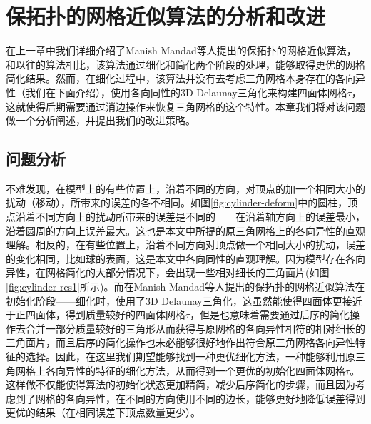 \chapter{保拓扑的网格近似算法的分析和改进}

在上一章中我们详细介绍了Manish Mandad等人提出的保拓扑的网格近似算法\cite{isotopic-appro}，和以往的算法相比，该算法通过细化和简化两个阶段的处理，能够取得更优的网格简化结果。然而，在细化过程中，该算法并没有去考虑三角网格本身存在的各向异性（我们在下面介绍），使用各向同性的3D Delaunay三角化来构建四面体网格$\tau$，这就使得后期需要通过消边操作来恢复三角网格的这个特性。本章我们将对该问题做一个分析阐述，并提出我们的改进策略。

\section{问题分析}
不难发现，在模型上的有些位置上，沿着不同的方向，对顶点的加一个相同大小的扰动（移动），所带来的误差的各不相同。如图\ref{fig:cylinder-deform}中的圆柱，顶点沿着不同方向上的扰动所带来的误差是不同的——在沿着轴方向上的误差最小，沿着圆周的方向上误差最大。这也是本文中所提的原三角网格上的各向异性的直观理解。相反的，在有些位置上，沿着不同方向对顶点做一个相同大小的扰动，误差的变化相同，比如球的表面，这是本文中各向同性的直观理解。因为模型存在各向异性，在网格简化的大部分情况下，会出现一些相对细长的三角面片(如图\ref{fig:cylinder-res1}所示)。而在Manish Mandad等人提出的保拓扑的网格近似算法在初始化阶段——细化时，使用了3D Delaunay三角化，这虽然能使得四面体更接近于正四面体，得到质量较好的四面体网格$\tau$，但是也意味着需要通过后序的简化操作去合并一部分质量较好的三角形从而获得与原网格的各向异性相符的相对细长的三角面片，而且后序的简化操作也未必能够很好地作出符合原三角网格各向异性特征的选择。因此，在这里我们期望能够找到一种更优细化方法，一种能够利用原三角网格上各向异性的特征的细化方法，从而得到一个更优的初始化四面体网格$\tau$。这样做不仅能使得算法的初始化状态更加精简，减少后序简化的步骤，而且因为考虑到了网格的各向异性，在不同的方向使用不同的边长，能够更好地降低误差得到更优的结果（在相同误差下顶点数量更少）。

